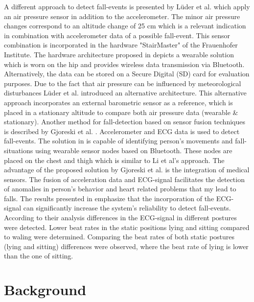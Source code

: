 \documentclass[review]{elsarticle}
\begin{document}
A different approach to detect fall-events is presented by Lüder et al. \cite{Luder2009} which apply an air pressure sensor in addition to the accelerometer. The minor air pressure changes correspond to an altitude change of 25 cm which is a relevant indication in combination with accelerometer data of a possible fall-event.  This sensor combination is incorporated in the hardware "StairMaster" of the Frauenhofer Institute. The hardware architecture proposed in \cite{Luder2009} depicts a wearable solution which is worn on the hip and provides wireless data transmission via Bluetooth. Alternatively, the data can be stored on a Secure Digital (SD) card for evaluation purposes. Due to the fact that air pressure can be influenced by meteorological disturbances Lüder et al. \cite{Luder2009} introduced an alternative architecture. This alternative approach incorporates an external barometric sensor as a reference, which is placed in a stationary altitude to compare both air pressure data (wearable \& stationary). Another method for fall-detection based on sensor fusion techniques is described by Gjoreski et al. \cite{Gjoreski2014}. Accelerometer and ECG data is used to detect fall-events. The solution in \cite{Gjoreski2014} is capable of identifying person's movements and fall-situations using wearable sensor nodes based on Bluetooth. These nodes are placed on the chest and thigh which is similar to Li et al's \cite{Li2009} approach. The advantage of the proposed solution by Gjoreski et al. \cite{Gjoreski2014} is the integration of medical sensors. The fusion of acceleration data and ECG-signal facilitates the detection of anomalies in person's behavior and heart related problems that my lead to falls. The results presented in \cite{Gjoreski2014} emphasize that the incorporation of the ECG-signal can significantly increase the system's reliability to detect fall-events. According to their analysis differences in the ECG-signal in different postures were detected. Lower beat rates in the static positions lying and sitting compared to waling were determined. Comparing the beat rates of both static postures (lying and sitting) differences were observed, where the beat rate of lying is lower than the one of sitting.



\section{Background}
\label{sec:background}
\end{document}
